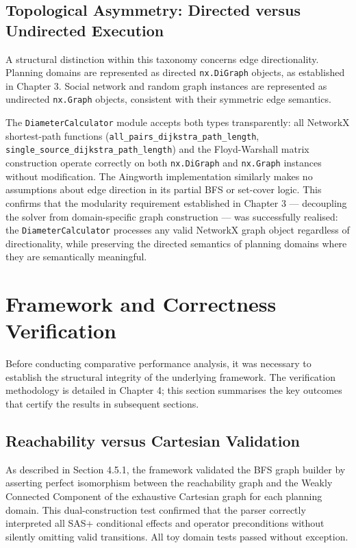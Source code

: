 \subsection{Topological Asymmetry: Directed versus Undirected Execution}

A structural distinction within this taxonomy concerns edge directionality. Planning domains are represented as directed \texttt{nx.DiGraph} objects, as established in Chapter 3. Social network and random graph instances are represented as undirected \texttt{nx.Graph} objects, consistent with their symmetric edge semantics.

The \texttt{DiameterCalculator} module accepts both types transparently: all NetworkX shortest-path functions (\texttt{all\_pairs\_dijkstra\_path\_length}, \texttt{single\_source\_dijkstra\_path\_length}) and the Floyd-Warshall matrix construction operate correctly on both \texttt{nx.DiGraph} and \texttt{nx.Graph} instances without modification. The Aingworth implementation similarly makes no assumptions about edge direction in its partial BFS or set-cover logic. This confirms that the modularity requirement established in Chapter 3 --- decoupling the solver from domain-specific graph construction --- was successfully realised: the \texttt{DiameterCalculator} processes any valid NetworkX graph object regardless of directionality, while preserving the directed semantics of planning domains where they are semantically meaningful.

\section{Framework and Correctness Verification}

Before conducting comparative performance analysis, it was necessary to establish the structural integrity of the underlying framework. The verification methodology is detailed in Chapter 4; this section summarises the key outcomes that certify the results in subsequent sections.

\subsection{Reachability versus Cartesian Validation}

As described in Section 4.5.1, the framework validated the BFS graph builder by asserting perfect isomorphism between the reachability graph and the Weakly Connected Component of the exhaustive Cartesian graph for each planning domain. This dual-construction test confirmed that the parser correctly interpreted all SAS+ conditional effects and operator preconditions without silently omitting valid transitions. All toy domain tests passed without exception.

